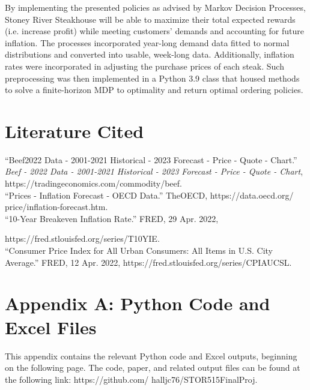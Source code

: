 \documentclass[12pt,a4paper]{article}
\begin{document}
By implementing the presented policies as advised by Markov Decision Processes, Stoney River Steakhouse will be able to maximize their total expected rewards (i.e. increase profit) while meeting customers' demands and accounting for future inflation. The processes incorporated year-long demand data fitted to normal distributions and converted into usable, week-long data. Additionally, inflation rates were incorporated in adjusting the purchase prices of each steak. Such preprocessing was then implemented in a Python 3.9 class that housed methods to solve a finite-horizon MDP to optimality and return optimal ordering policies. 

\section{Literature Cited}

“Beef2022 Data - 2001-2021 Historical - 2023 Forecast - Price - Quote - Chart.” 
\textit{Beef - 2022 Data - 2001-2021 Historical - 2023 Forecast - Price - Quote - Chart}, https://tradingeconomics.com/commodity/beef. 
\\

“Prices - Inflation Forecast - OECD Data.” TheOECD,
https://data.oecd.org/
price/inflation-forecast.htm. 
\\

“10-Year Breakeven Inflation Rate.” FRED, 29 Apr. 2022, 

https://fred.stlouisfed.org/series/T10YIE. 
\\

“Consumer Price Index for All Urban Consumers: All Items in U.S. City Average.” FRED, 12 Apr. 2022, https://fred.stlouisfed.org/series/CPIAUCSL. 

\section{Appendix A: Python Code and Excel Files}

This appendix contains the relevant Python code and Excel outputs, beginning on the following page. The code, paper, and related output files can be found at the following link: 
https://github.com/
halljc76/STOR515FinalProj. 
\\
\newpage

\small 
\end{document}

